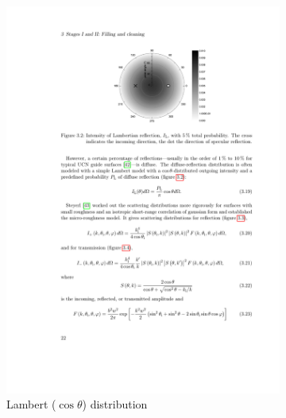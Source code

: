
\begin{figure}
\centering
\begin{subfigure}{.5\textwidth} 
  \centering
  \includegraphics[width=\textwidth]{figures/schreyer_lambertian.pdf}
  \caption{Lambert ($\cos\theta$) distribution}\label{subfig:lambert_diffuse}
\end{subfigure}%
\begin{subfigure}{.5\textwidth}
  \centering

\end{subfigure}
\end{figure}
